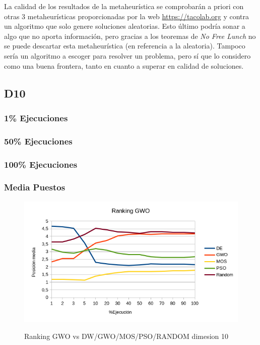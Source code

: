 \documentclass[a4paper, 12.5pt]{report}
\begin{document}
La calidad de los resultados de la metaheurística se comprobarán a priori con otras 3 metaheurísticas proporcionadas por la web \url{https://tacolab.org} y contra un algoritmo que solo genere soluciones aleatorias.     Esto último podría sonar a algo que no aporta información, pero gracias a los teoremas de \textit{No Free Lunch} no se puede descartar esta metaheurística (en referencia a la aleatoria). Tampoco sería un algoritmo a escoger para resolver un problema, pero sí que lo considero como una buena frontera, tanto en cuanto a superar en calidad de soluciones.



\subsection{D10}

\subsubsection*{1\% Ejecuciones}

\subsubsection*{50\% Ejecuciones}


\subsubsection*{100\% Ejecuciones}


\subsubsection*{Media Puestos}

\begin{figure}[H]

    \caption{Ranking GWO vs DW/GWO/MOS/PSO/RANDOM dimesion 10}

    \includegraphics[width=1\textwidth]{Resultados/basico/d10/Grafico_puestos.png} \label{img:ranking-D10}
\end{figure}
\end{document}
